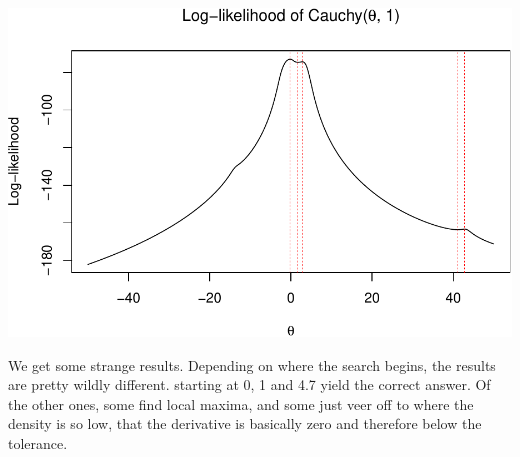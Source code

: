 \documentclass[]{article}
\newenvironment{Shaded}{\begin{snugshade}}{\end{snugshade}}
\newcommand{\KeywordTok}[1]{\textcolor[rgb]{0.13,0.29,0.53}{\textbf{#1}}}
\newcommand{\DataTypeTok}[1]{\textcolor[rgb]{0.13,0.29,0.53}{#1}}
\newcommand{\DecValTok}[1]{\textcolor[rgb]{0.00,0.00,0.81}{#1}}
\newcommand{\CharTok}[1]{\textcolor[rgb]{0.31,0.60,0.02}{#1}}
\newcommand{\StringTok}[1]{\textcolor[rgb]{0.31,0.60,0.02}{#1}}
\newcommand{\CommentTok}[1]{\textcolor[rgb]{0.56,0.35,0.01}{\textit{#1}}}
\newcommand{\ControlFlowTok}[1]{\textcolor[rgb]{0.13,0.29,0.53}{\textbf{#1}}}
\newcommand{\OperatorTok}[1]{\textcolor[rgb]{0.81,0.36,0.00}{\textbf{#1}}}
\newcommand{\NormalTok}[1]{#1}
\begin{document}
\begin{Shaded}
\end{Shaded}

\includegraphics{Atlas-PS_2_files/figure-latex/unnamed-chunk-7-1.pdf}

We get some strange results. Depending on where the search begins, the
results are pretty wildly different. starting at 0, 1 and 4.7 yield the
correct answer. Of the other ones, some find local maxima, and some just
veer off to where the density is so low, that the derivative is
basically zero and therefore below the tolerance.
\end{document}
